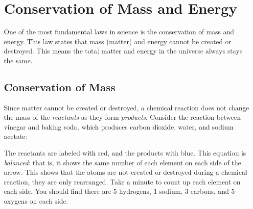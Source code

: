 \chapter{Conservation of Mass and Energy}\label{chap:conservationMassEnergy}

One of the most fundamental laws in science is the conservation of mass and 
energy. This law states that mass (matter) and energy cannot be created or 
destroyed. This means the total matter and energy in the universe always stays 
the same. 

\section{Conservation of Mass}
Since matter cannot be created or destroyed, a chemical reaction does not change 
the mass of the \textit{reactants} as they form \textit{products}. Consider the reaction between 
vinegar and baking soda, which produces carbon dioxide, water, and sodium acetate:

\begin{center}
\end{center}

The reactants are labeled with red, and the products with blue. This equation is
\textit{balanced}: that is, it shows the same number of each element on each side
of the arrow. This shows that the atoms are not created or destroyed during a 
chemical reaction, they are only rearranged. Take a minute to count up each 
element on each side. You should find there are 5 hydrogens, 1 sodium, 3 carbons,
and 5 oxygens on each side. 

